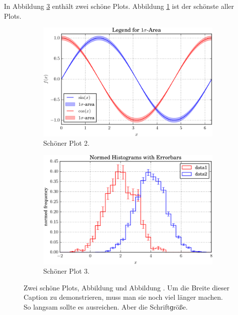 \documentclass{scrartcl}
\begin{document}
In Abbildung \ref{fig:subfigs} enthält zwei schöne Plots.
Abbildung \ref{fig:plot2} ist der schönste aller Plots.
\begin{figure}
  \hspace*{\fill}
  \begin{subfigure}{0.40\textwidth}
    \centering
    \includegraphics[width=\textwidth]{plot2.pdf}
    \caption{Schöner Plot 2.}
    \label{fig:plot2}
  \end{subfigure}
  \hspace*{\fill}
  \begin{subfigure}{0.40\textwidth}
    \centering
    \includegraphics[width=\textwidth]{plot3.pdf}
    \caption{Schöner Plot 3.}
    \label{fig:plot3}
  \end{subfigure}
  \hspace*{\fill}
  \caption{
    Zwei schöne Plots, Abbildung  und Abbildung .
    Um die Breite dieser Caption zu demonstrieren, muss man sie noch viel länger machen. 
    So langsam sollte es ausreichen.
    Aber die Schriftɡröße.
  }
  \label{fig:subfigs}
\end{figure}
\end{document}
